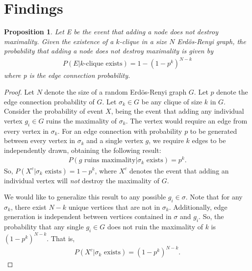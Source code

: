 \documentclass{article}
\newtheorem{prop}[thm]{Proposition}
\theoremstyle{definition}
\theoremstyle{remark}
\begin{document}
\section{Findings}
\label{sec:Findings}
\begin{prop}
    Let E be the event that adding a node does not destroy maximality. Given the existence of a $k$-clique in a size $N$ Erd{\"o}s-Renyi graph, the probability that adding a node does not destroy maximality is given by
    \begin{align}
        \label{eq:e of max clique}
        P(E|k\text{-clique exists}) = 1-(1-p^k)^{N-k}
    \end{align}
    where p is the edge connection probability.
\end{prop}
\begin{proof}
    Let $N$ denote the size of a random Erd{\"o}s-Renyi graph $G$. Let $p$ denote the edge connection probability of $G$. Let $\sigma_k\in G$ be any clique of size $k$ in $G$. Consider the probability of event $X$, being the event that adding any individual vertex $g_i\in G$ ruins the maximality of $\sigma_k$. The vertex would require an edge from every vertex in $\sigma_k$. For an edge connection with probability $p$ to be generated between every vertex in $\sigma_k$ and a single vertex $g$, we require $k$ edges to be independently drawn, obtaining the following result:
    \begin{align}
        \label{eq:}
        P \left(g \text{ ruins maximality}|\sigma_k \text{ exists} \right) = p^k.
    \end{align}
    So, $P(X^c|\sigma_k \text{ exists}) = 1-p^k$, where $X^c$ denotes the event that adding an individual vertex will \textit{not} destroy the maximality of $G$.

    We would like to generalize this result to any possible $g_i\in\sigma$. Note that for any $\sigma_k$, there exist $N-k$ unique vertices that are not in $\sigma_k$. Additionally, edge generation is independent between vertices contained in $\sigma$ and $g_i$. So, the probability that any single $g_i\in G$ does not ruin the maximality of $k$ is $(1-p^k)^{N-k}$. That is,
    \begin{align}
        \label{eq:}
        P \left( X^c|\sigma_k \text{ exists} \right) = (1-p^k)^{N-k}.
    \end{align}
\end{proof}
\end{document}
